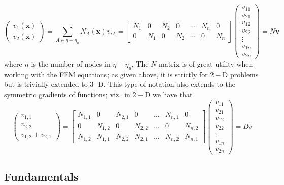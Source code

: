 \[
\left(\begin{array}{l}
v_{1}(\boldsymbol{x}) \\
v_{2}(\boldsymbol{x})
\end{array}\right)=\sum_{A \in \eta-\eta_{u}} N_{A}(\boldsymbol{x}) v_{i A}=\left[\begin{array}{ccccccc}
N_{1} & 0 & N_{2} & 0 & \cdots & N_{n} & 0 \\
0 & N_{1} & 0 & N_{2} & \cdots & 0 & N_{n}
\end{array}\right]\left(\begin{array}{c}
v_{11} \\
v_{21} \\
v_{12} \\
v_{22} \\
\vdots \\
v_{1 n} \\
v_{2 n}
\end{array}\right)=N \boldsymbol{v}
\] where \(n\) is the number of nodes in \(\eta-\eta_{u} .\) The \(N\)
matrix is of great utility when working with the FEM equations; as given
above, it is strictly for \(2-\mathrm{D}\) problems but is trivially
extended to 3 -D. This type of notation also extends to the symmetric
gradients of functions; viz.~in \(2-\mathrm{D}\) we have that \[
\left(\begin{array}{c}
v_{1,1} \\
v_{2,2} \\
v_{1,2}+v_{2,1}
\end{array}\right)=\left[\begin{array}{ccccccc}
N_{1,1} & 0 & N_{2,1} & 0 & \ldots & N_{n, 1} & 0 \\
0 & N_{1,2} & 0 & N_{2,2} & \ldots & 0 & N_{n, 2} \\
N_{1,2} & N_{1,1} & N_{2,2} & N_{2,1} & \ldots & N_{n, 2} & N_{n, 1}
\end{array}\right]\left(\begin{array}{c}
v_{11} \\
v_{21} \\
v_{12} \\
v_{22} \\
\vdots \\
v_{1 n} \\
v_{2 n}
\end{array}\right)=B v
\]

\hypertarget{fundamentals}{%
\subsection{Fundamentals}\label{fundamentals}}

